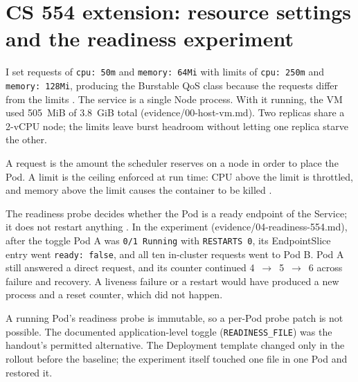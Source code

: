 \documentclass[11pt,letterpaper]{article}
\newcommand{\code}[1]{\texttt{#1}}
\begin{document}
\section{CS 554 extension: resource settings and the readiness experiment}

I set requests of \code{cpu: 50m} and \code{memory: 64Mi} with limits of \code{cpu: 250m} and \code{memory: 128Mi}, producing the Burstable QoS class because the requests differ from the limits \cite{k8s-qos}. The service is a single Node process. With it running, the VM used 505~MiB of 3.8~GiB total (evidence/00-host-vm.md). Two replicas share a 2-vCPU node; the limits leave burst headroom without letting one replica starve the other.

A request is the amount the scheduler reserves on a node in order to place the Pod. A limit is the ceiling enforced at run time: CPU above the limit is throttled, and memory above the limit causes the container to be killed \cite{k8s-resources}.

The readiness probe decides whether the Pod is a ready endpoint of the Service; it does not restart anything \cite{k8s-probes}. In the experiment (evidence/04-readiness-554.md), after the toggle Pod A was \code{0/1 Running} with \code{RESTARTS 0}, its EndpointSlice entry went \code{ready: false}, and all ten in-cluster requests went to Pod B. Pod A still answered a direct request, and its counter continued 4~$\rightarrow$~5~$\rightarrow$~6 across failure and recovery. A liveness failure or a restart would have produced a new process and a reset counter, which did not happen.

A running Pod's readiness probe is immutable, so a per-Pod probe patch is not possible. The documented application-level toggle (\code{READINESS\_FILE}) was the handout's permitted alternative. The Deployment template changed only in the rollout before the baseline; the experiment itself touched one file in one Pod and restored it.



\end{document}
